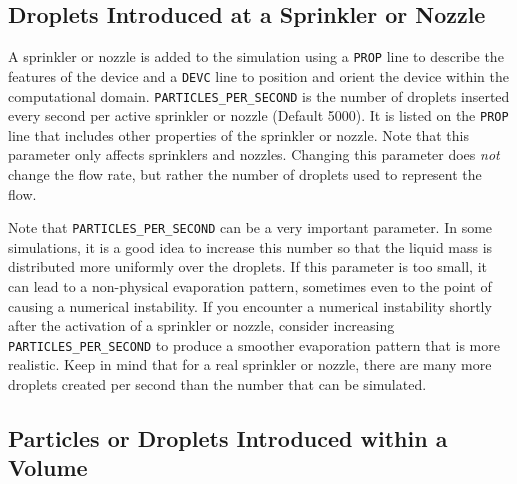\documentclass[11pt]{book}
\newcommand{\ct}{\tt\small}
\begin{document}
\subsection{Droplets Introduced at a Sprinkler or Nozzle}

\label{info:sprinkler_droplets}

A sprinkler or nozzle is added to the simulation using a {\ct PROP} line to describe the features of the device and a {\ct DEVC} line to position and orient the
device within the computational domain.
{\ct PARTICLES\_PER\_SECOND} is the  number of droplets inserted every
second per active sprinkler or nozzle (Default 5000). It is listed on the {\ct PROP} line that includes other properties of
the sprinkler or nozzle. Note that this parameter only affects sprinklers and nozzles.
Changing this parameter does {\em not} change the flow rate, but rather the number
of droplets used to represent the flow.

\begin{warning}
Note that {\ct PARTICLES\_PER\_SECOND} can be a very important parameter. In some simulations, it is a good idea to increase this number so that the
liquid mass is distributed more uniformly over the droplets. If this parameter is too small, it can lead to a non-physical evaporation pattern, sometimes even to the
point of causing a numerical instability. If you encounter a numerical instability shortly after the activation of a sprinkler or nozzle, consider increasing
{\ct PARTICLES\_PER\_SECOND} to produce a smoother evaporation pattern that is more realistic. Keep in mind that for a real sprinkler or nozzle, there are many more
droplets created per second than the number that can be simulated.
\end{warning}

\subsection{Particles or Droplets Introduced within a Volume}

\label{info:initial_droplets}
\end{document}
